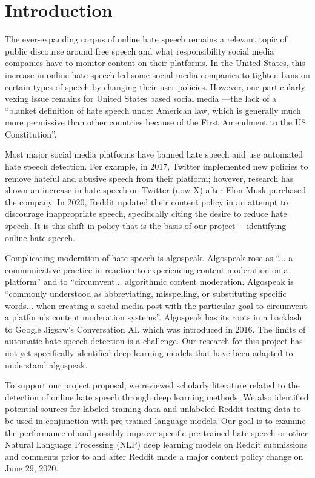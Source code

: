 \documentclass[conference]{IEEEtran}
\begin{document}
\section{Introduction}
The ever-expanding corpus of online hate speech remains a relevant topic of public discourse around free speech and what responsibility social media companies have to monitor content on their platforms. In the United States, this increase in online hate speech led some social media companies to tighten bans on certain types of speech by changing their user policies. However, one particularly vexing issue remains for United States based social media ---the lack of a “blanket definition of hate speech under American law, which is generally much more permissive than other countries because of the First Amendment to the US Constitution”\cite{b1}. 

Most major social media platforms have banned hate speech and use automated hate speech detection\cite{b2}. For example, in 2017, Twitter implemented new policies to remove hateful and abusive speech from their platform\cite{b3}; however, research has shown an increase in hate speech on Twitter (now X) after Elon Musk purchased the company\cite{b1}. In 2020, Reddit updated their content policy in an attempt to discourage inappropriate speech, specifically citing the desire to reduce hate speech\cite{b4}. It is this shift in policy that is the basis of our project ---identifying online hate speech.

Complicating moderation of hate speech is algospeak. Algospeak rose as “... a communicative practice in reaction to experiencing content moderation on a platform” and to “circumvent... algorithmic content moderation\cite{b5}. Algospeak is “commonly understood as abbreviating, misspelling, or substituting specific words... when creating a social media post with the particular goal to circumvent a platform’s content moderation systems”\cite{b5}. Algospeak has its roots in a backlash to Google Jigsaw’s Conversation AI, which was introduced in 2016\cite{b6}. The limits of automatic hate speech detection is a challenge. Our research for this project has not yet specifically identified deep learning models that have been adapted to understand algospeak.

To support our project proposal, we reviewed scholarly literature related to the detection of online hate speech through deep learning methods. We also identified potential sources for labeled training data and unlabeled Reddit testing data to be used in conjunction with pre-trained language models. Our goal is to examine the performance of and possibly improve specific pre-trained hate speech or other Natural Language Processing (NLP) deep learning models on Reddit submissions and comments prior to and after Reddit made a major content policy change on June 29, 2020.
\end{document}
